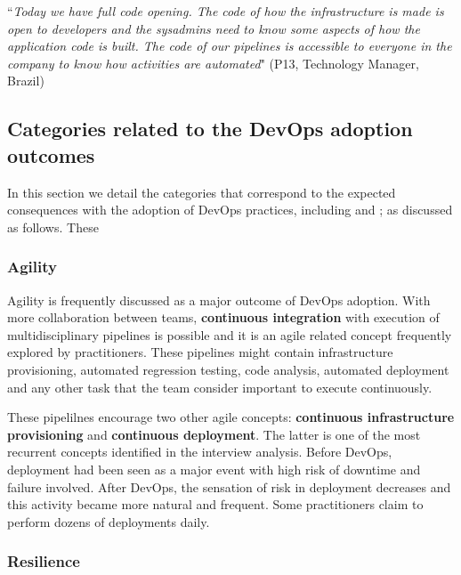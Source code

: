 \begin{mq}
``\emph{Today we have full code opening. The code of how the infrastructure is
made is open to developers and the sysadmins need to know some aspects of how
the application code is built. The code of our pipelines is accessible to
everyone in the company to know how activities are automated}" (P13, Technology
Manager, Brazil)
\end{mq}


\subsection{Categories related to the DevOps adoption outcomes}

In this section we detail the categories that correspond to
the expected consequences with the adoption of
DevOps practices, including  and ;
as discussed as follows.
These
\subsubsection{Agility}

Agility is frequently discussed as a major outcome of DevOps adoption. With more
collaboration between teams, \textbf{continuous integration} with execution of
multidisciplinary pipelines is possible and it is an agile related concept
frequently explored by practitioners. These pipelines might contain
infrastructure provisioning, automated regression testing, code analysis,
automated deployment and any other task that the team consider important to
execute continuously.

These pipelilnes encourage two other agile concepts: \textbf{continuous
infrastructure provisioning} and \textbf{continuous deployment}. The latter is
one of the most recurrent concepts identified in the interview analysis. Before
DevOps, deployment had been seen as a major event with high risk of downtime and
failure involved. After DevOps, the sensation of risk in deployment decreases
and this activity became more natural and frequent. Some practitioners claim
to perform dozens of deployments daily.

\subsubsection*{Resilience}

